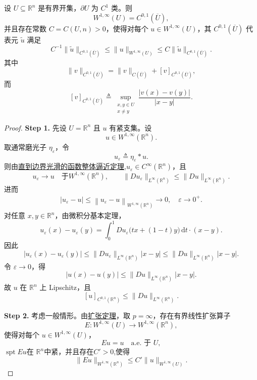\documentclass[../../main.tex]{subfiles}
\begin{document}
\begin{theorem}
\label{theorem:ch05-W1infty刻画}
设 \(U\subseteq\mathbb R^n\) 是有界开集，\(\partial U\) 为 \(C^1\) 类。则
\[
W^{1,\infty}(U)=C^{0,1}(\overline U),
\]
并且存在常数 \(C=C(U,n)>0\)，使得对每个 \(u\in W^{1,\infty}(U)\)，其 \(C^{0,1}(\overline U)\) 代表元 \(\widetilde u\) 满足
\[
C^{-1}\|\widetilde u\|_{C^{0,1}(\overline U)}
\leqslant
\|u\|_{W^{1,\infty}(U)}
\leqslant
C\|\widetilde u\|_{C^{0,1}(\overline U)}.
\]
其中
\[
\|v\|_{C^{0,1}(\overline U)}
=
\|v\|_{C(\overline U)}
+
[v]_{C^{0,1}(\overline U)},
\]
而
\[
[v]_{C^{0,1}(\overline U)}
\triangleq
\sup_{\substack{x,y\in U\\x\neq y}}
\frac{|v(x)-v(y)|}{|x-y|}.
\]
\end{theorem}
\begin{proof}

\textbf{Step 1.} 先设 \(U=\mathbb R^n\) 且 \(u\) 有紧支集。设
\[
u\in W^{1,\infty}(\mathbb R^n).
\]
取通常磨光子 \(\eta_\varepsilon\)，令
\[
u_\varepsilon\triangleq\eta_\varepsilon*u.
\]
则由\hyperref[theorem:ch05-直到边界光滑的函数整体逼近定理]{直到边界光滑的函数整体逼近定理},\(u_\varepsilon\in C^\infty(\mathbb R^n)\)，且
\[
u_{\varepsilon}\longrightarrow u\quad \text{于}W^{1,\infty}\left( \mathbb{R} ^n \right) ,
\qquad
\|Du_\varepsilon\|_{L^\infty(\mathbb R^n)}
\leqslant
\|Du\|_{L^\infty(\mathbb R^n)}.
\]
进而
\begin{align*}
\left| u_{\varepsilon}-u \right|\leqslant \left\| u_{\varepsilon}-u \right\| _{W^{1,\infty}\left( \mathbb{R} ^n \right)}\rightarrow 0,\quad \varepsilon \rightarrow 0^+.
\end{align*}
对任意 \(x,y\in\mathbb R^n\)，由微积分基本定理，
\[
u_\varepsilon(x)-u_\varepsilon(y)
=
\int_0^1
Du_\varepsilon\bigl(tx+(1-t)y\bigr)\,\mathrm{d}t\cdot(x-y).
\]
因此
\[
|u_\varepsilon(x)-u_\varepsilon(y)|
\leqslant
\|Du_\varepsilon\|_{L^\infty(\mathbb R^n)}|x-y|
\leqslant
\|Du\|_{L^\infty(\mathbb R^n)}|x-y|.
\]
令 \(\varepsilon\to0\)，得
\[
|u(x)-u(y)|
\leqslant
\|Du\|_{L^\infty(\mathbb R^n)}|x-y|.
\]
故 \(u\) 在 \(\mathbb R^n\) 上 Lipschitz，且
\[
\left[ u \right] _{C^{0,1}\left( \mathbb{R} ^n \right)}
\leqslant
\|Du\|_{L^\infty(\mathbb R^n)}.
\]

\textbf{Step 2.} 考虑一般情形。由\hyperref[theorem:ch05-扩张定理]{扩张定理}，取 \(p=\infty\)，存在有界线性扩张算子
\[
E:W^{1,\infty}(U)\to W^{1,\infty}(\mathbb R^n),
\]
使得对每个 \(u\in W^{1,\infty}(U)\)，
\[
Eu=u\quad\text{a.e. 于 }U,
\]
\(\operatorname{spt}Eu\)在 $\mathbb{R}^{n}$中紧，并且存在$C'>0$,使得
\[
\|Eu\|_{W^{1,\infty}(\mathbb R^n)}
\leqslant
C'\|u\|_{W^{1,\infty}(U)}.
\]


\end{proof}
\end{document}
